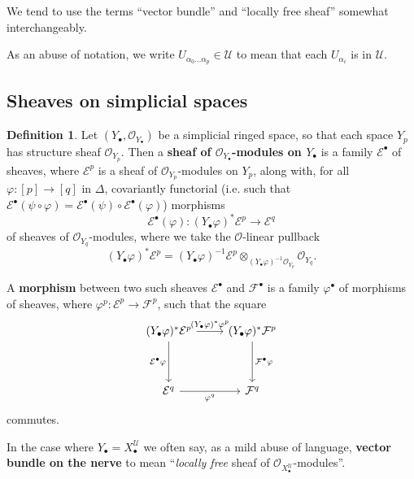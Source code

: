 \documentclass[11pt,fleqn]{article}
\theoremstyle{plain}
\theoremstyle{definition}
\newtheorem{definition}[theorem]{Definition}
\theoremstyle{remark}
\numberwithin{equation}{theorem}
\newcommand{\cover}{\mathcal{U}}
\newcommand{\OO}{\mathcal{O}}
\newcommand{\define}[1]{\textbf{#1}}
\newcommand{\nerve}[1]{X_{#1}^\cover}
\begin{document}
        \medskip

        We tend to use the terms ``vector bundle'' and ``locally free sheaf'' somewhat interchangeably.

        \medskip

        As an abuse of notation, we write $U_{\alpha_0\ldots\alpha_p}\in\cover$ to mean that each $U_{\alpha_i}$ is in $\cover$.


    \subsection{Sheaves on simplicial spaces}

        \begin{definition}\label{definition:sheaf-on-a-simplicial-space}
            Let $(Y_\bullet,\OO_{Y_\bullet})$ be a simplicial ringed space, so that each space $Y_p$ has structure sheaf $\OO_{Y_p}$.
            Then a \define{sheaf of $\OO_{Y_\bullet}$-modules on $Y_\bullet$} is a family $\mathcal{E}^\bullet$ of sheaves, where $\mathcal{E}^p$ is a sheaf of $\OO_{Y_p}$-modules on $Y_p$, along with, for all $\varphi\colon[p]\to[q]$ in $\Delta$, covariantly functorial (i.e. such that $\mathcal{E}^\bullet(\psi\circ\varphi) = \mathcal{E}^\bullet(\psi)\circ \mathcal{E}^\bullet(\varphi)$) morphisms
            \[
                \mathcal{E}^\bullet(\varphi) \colon (Y_\bullet\varphi)^*\mathcal{E}^p \to \mathcal{E}^q
            \]
            of sheaves of $\OO_{Y_q}$-modules, where we take the $\OO$-linear pullback
            \[
                (Y_\bullet\varphi)^*\mathcal{E}^p
                =
                (Y_\bullet\varphi)^{-1}\mathcal{E}^p
                \otimes_{(Y_\bullet\varphi)^{-1}\OO_{Y_p}}
                \OO_{Y_q}.
            \]

            A \define{morphism} between two such sheaves $\mathcal{E}^\bullet$ and $\mathcal{F}^\bullet$ is a family $\varphi^\bullet$ of morphisms of sheaves, where $\varphi^p\colon \mathcal{E}^p\to \mathcal{F}^p$, such that the square
            \[
                \begin{tikzcd}[row sep=huge]
                    (Y_\bullet\varphi)^*\mathcal{E}^p
                        \ar[r,"(Y_\bullet\varphi)^*\varphi^p"]
                        \ar[d,swap,"\mathcal{E}^\bullet\varphi"]
                &   (Y_\bullet\varphi)^*\mathcal{F}^p
                        \ar[d,"\mathcal{F}^\bullet\varphi"]
                \\  \mathcal{E}^q
                        \ar[r,swap,"\varphi^q"]
                &   \mathcal{F}^q
                \end{tikzcd}
            \]
            commutes.

            In the case where $Y_\bullet=\nerve{\bullet}$ we often say, as a mild abuse of language, \define{vector bundle on the nerve} to mean ``\emph{locally free} sheaf of $\OO_{\nerve{\bullet}}$-modules''.
        \end{definition}
\end{document}
